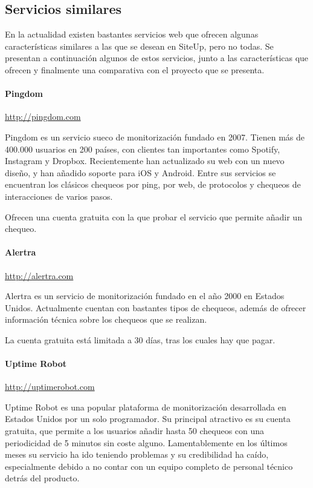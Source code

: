 \subsection{Servicios similares}

En la actualidad existen bastantes servicios web que ofrecen algunas
características similares a las que se desean en SiteUp, pero no todas. Se
presentan a continuación algunos de estos servicios, junto a las características
que ofrecen y finalmente una comparativa con el proyecto que se presenta.

\paragraph{Pingdom} \url{http://pingdom.com}

Pingdom es un servicio sueco de monitorización fundado en 2007. Tienen más de
400.000 usuarios en 200 países, con clientes tan importantes como Spotify,
Instagram y Dropbox. Recientemente han actualizado su web con un nuevo diseño, y
han añadido soporte para iOS y Android. Entre sus servicios se encuentran los
clásicos chequeos por ping, por web, de protocolos y chequeos de interacciones
de varios pasos.

Ofrecen una cuenta gratuita con la que probar el servicio que permite añadir un
chequeo.

\paragraph{Alertra} \url{http://alertra.com}

Alertra es un servicio de monitorización fundado en el año 2000 en Estados
Unidos. Actualmente cuentan con bastantes tipos de chequeos, además de ofrecer
información técnica sobre los chequeos que se realizan.

La cuenta gratuita está limitada a 30 días, tras los cuales hay que pagar.


\paragraph{Uptime Robot} \url{http://uptimerobot.com}

Uptime Robot es una popular plataforma de monitorización desarrollada en Estados
Unidos por un solo programador. Su principal atractivo es su cuenta gratuita,
que permite a los usuarios añadir hasta 50 chequeos con una periodicidad de 5
minutos sin coste alguno. Lamentablemente en los últimos meses su servicio ha
ido teniendo problemas y su credibilidad ha caído, especialmente debido a no
contar con un equipo completo de personal técnico detrás del producto.

